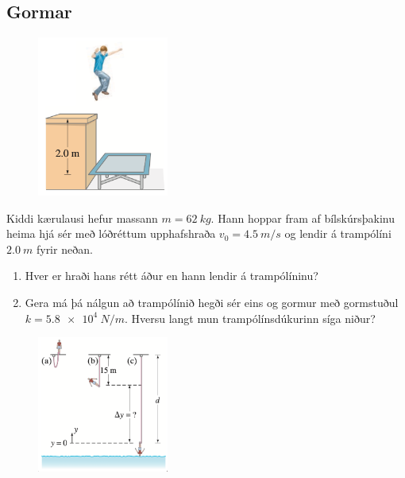 \ifdefined \wholebook \else\documentclass[oneside]{book}\usepackage{EdlBook}\graphicspath{{figures/}}
\begin{document}
\begin{enumerate}[label = \textbf{Dæmi \thechapter.\arabic*.}]
\subsection*{Gormar}
    
\begin{minipage}{\linewidth}
\begin{figure}
\vspace{-1.5cm}
\includegraphics[width=1.7in]{images/hopp.png}
\end{figure}
    
    \item Kiddi kærulausi hefur massann $m = \SI{62}{kg}$. Hann hoppar fram af bílskúrsþakinu heima hjá sér með lóðréttum upphafshraða $v_0 = \SI{4.5}{m/s}$ og lendir á trampólíni $\SI{2.0}{m}$ fyrir neðan. 
    
    \begin{enumerate}[label = \textbf{(\alph*)}]
        \item Hver er hraði hans rétt áður en hann lendir á trampólíninu?
        
        \item Gera má þá nálgun að trampólínið hegði sér eins og gormur með gormstuðul $k = \SI{5.8e4}{N/m}$. Hversu langt mun trampólínsdúkurinn síga niður?
    \end{enumerate}
    
    \end{minipage}
    
\begin{minipage}{\linewidth}
\begin{figure}
\vspace{1cm}
\includegraphics[width=1.7in]{kaflar/kafli07/figures/frikki.png}
\end{figure}
    

\end{minipage}
\end{enumerate}
\end{document}
